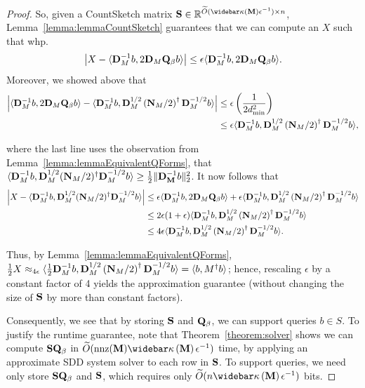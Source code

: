 \begin{proof}
So, given a CountSketch matrix $\Smat \in \R^{\Otilde{\pcondOf{\M}\epsilon^{-1}} \times n}$, Lemma~\ref{lemma:lemmaCountSketch} guarantees that we can compute an $X$ such that whp.\, 
\begin{align*}
    \left| X - \langle {\mathbf{D}}_{M}^{-1} b, 2{\mathbf{D}}_{M} \mathbf{Q}_\beta b\rangle \right| \leq \epsilon \langle {\mathbf{D}}_{M}^{-1} b, 2{\mathbf{D}}_{M} \mathbf{Q}_\beta b\rangle.
\end{align*}
Moreover, we showed above that
\begin{align*}
     \left| \langle {\mathbf{D}}_{M}^{-1} b, 2{\mathbf{D}}_{M} \mathbf{Q}_\beta b\rangle - \langle {\mathbf{D}}_{M}^{-1} b, {\mathbf{D}}_{M}^{1/2}\left(\mathbf{N}_{M}/2\right)^\dagger {\mathbf{D}}_{M}^{-1/2} b \rangle \right| &\leq \epsilon \left( \frac{1}{2 d_{\min} ^2} \right) \\
     &\leq \epsilon \langle {\mathbf{D}}_{M}^{-1} b, {\mathbf{D}}_{M}^{1/2}\left(\mathbf{N}_{M}/2\right)^\dagger {\mathbf{D}}_{M}^{-1/2} b \rangle,  
\end{align*}

where the last line uses the observation from Lemma~\ref{lemma:lemmaEquivalentQForms}, that $\langle {\mathbf{D}}_{M}^{-1} b, {\mathbf{D}}_{M}^{1/2}(\mathbf{N}_{M}/2)^\dagger {\mathbf{D}}_{M}^{-1/2} b \rangle \geq \frac{1}{2} \|{\mathbf{D}}_{\mathbf{M}}^{-1}b\|_2^2$. It now follows that
\begin{align*}
    \left| X - \langle {\mathbf{D}}_{M}^{-1} b, {\mathbf{D}}_{M}^{1/2}(\mathbf{N}_{M}/2)^\dagger {\mathbf{D}}_{M}^{-1/2} b \rangle  \right| &\leq \epsilon \langle {\mathbf{D}}_{M}^{-1} b, 2{\mathbf{D}}_{M} \mathbf{Q}_\beta b\rangle + \epsilon \langle {\mathbf{D}}_{M}^{-1} b, {\mathbf{D}}_{M}^{1/2}\left(\mathbf{N}_{M}/2\right)^\dagger {\mathbf{D}}_{M}^{-1/2} b \rangle \\
    &\leq 2\epsilon(1+\epsilon) \langle {\mathbf{D}}_{M}^{-1} b, {\mathbf{D}}_{M}^{1/2}\left(\mathbf{N}_{M}/2\right)^\dagger {\mathbf{D}}_{M}^{-1/2} b \rangle \\
    &\leq 4\epsilon \langle {\mathbf{D}}_{M}^{-1} b, {\mathbf{D}}_{M}^{1/2}\left(\mathbf{N}_{M}/2\right)^\dagger {\mathbf{D}}_{M}^{-1/2} b \rangle.
\end{align*}

Thus, by Lemma~\ref{lemma:lemmaEquivalentQForms}, $\frac{1}{2} X \approx_{4\epsilon} \langle \frac{1}{2} {\mathbf{D}}_{M}^{-1} b, {\mathbf{D}}_{M}^{1/2}\left(\mathbf{N}_{M}/2\right)^\dagger {\mathbf{D}}_{M}^{-1/2} b \rangle = \langle b, M^\dagger b \rangle$; hence, rescaling $\epsilon$ by a constant factor of 4 yields the approximation guarantee (without changing the size of $\mathbf{S}$ by more than constant factors). 

Consequently, we see that by storing $\mathbf{S}$ and $\mathbf{Q}_\beta$, we can support queries $b \in S$. To justify the runtime guarantee, note that Theorem~\ref{theorem:solver} shows we can compute $\mathbf{S} \mathbf{Q}_\beta$ in $\Otilde{\nnz(\M)\pcondOf{\M}\epsilon^{-1}}$ time, by applying an approximate SDD system solver to each row in $\mathbf{S}$. To support queries, we need only store $\mathbf{S} \mathbf{Q}_\beta$ and $\mathbf{S}$, which requires only $\Otilde{n \pcondOf{\M} \epsilon^{-1}}$ bits. 


\end{proof}
